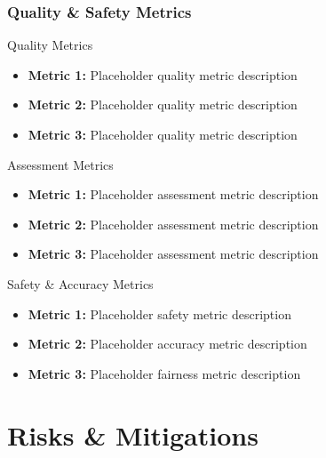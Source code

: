 \begin{frame}
\frametitle{Quality \& Safety Metrics}
\begin{block}{Quality Metrics}
\begin{itemize}
\item \textbf{Metric 1:} Placeholder quality metric description
\item \textbf{Metric 2:} Placeholder quality metric description
\item \textbf{Metric 3:} Placeholder quality metric description
\end{itemize}
\end{block}

\begin{block}{Assessment Metrics}
\begin{itemize}
\item \textbf{Metric 1:} Placeholder assessment metric description
\item \textbf{Metric 2:} Placeholder assessment metric description
\item \textbf{Metric 3:} Placeholder assessment metric description
\end{itemize}
\end{block}

\begin{block}{Safety \& Accuracy Metrics}
\begin{itemize}
\item \textbf{Metric 1:} Placeholder safety metric description
\item \textbf{Metric 2:} Placeholder accuracy metric description
\item \textbf{Metric 3:} Placeholder fairness metric description
\end{itemize}
\end{block}
\end{frame}

\section{Risks \& Mitigations}\label{sec:risks}

